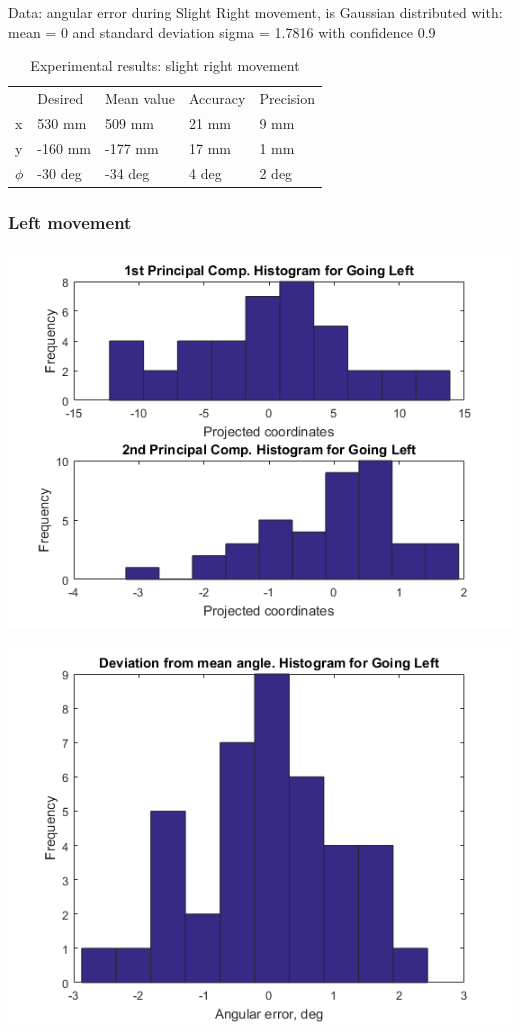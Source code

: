 \documentclass[a4paper, 12pt]{article}
\begin{document}
\smallskip


Data: angular error during   Slight Right movement, is Gaussian distributed with: mean = 0 and standard deviation sigma = 1.7816 with confidence 0.9%

\begin{table}[!h]
\centering
\caption{Experimental results: slight right movement}
\begin{tabular}{lllll}
     & Desired & Mean value & Accuracy & Precision \\
x    &  530  mm     &    509  mm      &    21  mm    &     9  mm    \\
y    &  -160 mm     &     -177  mm     &  17    mm    &    1 mm      \\
$\phi$ &  -30   deg    &     -34    deg   &     4 deg     & 2 deg
\end{tabular}
\end{table}

\newpage
\subsubsection{Left movement}

\begin{center}
  \includegraphics[scale=0.6]{ll2}
  
  
  \includegraphics[scale=0.6]{ll3}
\end{center}
\end{document}
